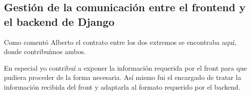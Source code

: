 \subsection*{Gestión de la comunicación entre el frontend y el backend de Django}

Como comentó Alberto el contrato entre los dos extremos se encontraba aquí, donde contribuímos ambos.

En especial yo contribuí a exponer la información requerida por el front para que pudiera proceder de la forma necesaria. Así mismo fui el encargado de tratar la información recibida del front y adaptarla al formato requerido por el backend.